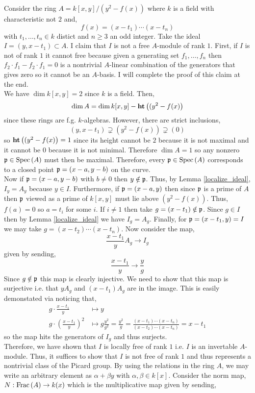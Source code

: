 \documentclass[12pt]{article}
\begin{document}
Consider the ring $A = k[x,y] / (y^2 - f(x))$ where $k$ is a field with characteristic not $2$ and,
\[ f(x) = (x - t_1) \cdots (x - t_n) \]
with $t_1, \dots, t_n \in k$ distict and $n \ge 3$ an odd integer. Take the ideal $I = (y, x - t_1) \subset A$. I claim that $I$ is not a free $A$-module of rank $1$. First, if $I$ is not of rank $1$ it cannot free because given a generating set $f_1, \dots, f_n$ then $f_2 \cdot f_1 - f_2 \cdot f_1 = 0$ is a nontrivial $A$-linear combination of the generators that gives zero so it cannot be an $A$-basis. I will complete the proof of this claim at the end.
\bigskip\\
We have $\dim{k[x,y]} = 2$ since $k$ is a field. Then, 
\[ \dim{A} = \dim{k[x,y]} - \mathbf{ht}\left( (y^2 - f(x) \right) \]
since these rings are f.g. $k$-algebras. However, there are strict inclusions,
\[ (y, x - t_1) \supsetneq (y^2 - f(x)) \supsetneq (0) \]
so $\mathbf{ht}\left( (y^2 - f(x) \right) = 1$ since its height cannot be $2$ because it is not maximal and it cannot be $0$ because it is not minimal. Therefore $\dim{A} = 1$ so any nonzero $\mathfrak{p} \in \mathrm{Spec}\left( A \right)$ must then be maximal. Therefore, every $\mathfrak{p} \in \mathrm{Spec}\left( A \right)$ corresponds to a closed point $\mathfrak{p} = (x - a, y - b)$ on the curve. 
\bigskip\\
Now if $\mathfrak{p} = (x - a, y - b)$ with $b \neq 0$ then $y \notin \mathfrak{p}$. Thus, by Lemma \ref{localize_ideal}, $I_y = A_y$ because $y \in I$. Furthermore, if $\mathfrak{p} = (x - a, y)$ then since $\mathfrak{p}$ is a prime of $A$ then $\mathfrak{p}$ viewed as a prime of $k[x,y]$ must lie above $(y^2 - f(x))$. Thus, $f(a) = 0$ so $a = t_i$ for some $i$. If $i \neq 1$ then take $g = (x - t_1) \notin \mathfrak{p}$. Since $g \in I$ then by Lemma \ref{localize_ideal} we have $I_g = A_g$. Finally, for $\mathfrak{p} = (x - t_1, y) = I$ we may take $g = (x - t_2) \cdots (x - t_n)$. Now consider the map,
\[ \frac{x - t_1}{y} A_g \to I_g \]
given by sending,
\[ \frac{x - t_1}{y} \to \frac{y}{g} \]
Since $g \notin \mathfrak{p}$ this map is clearly injective. We need to show that this map is surjective i.e. that $y A_g$ and $(x - t_1) A_g$ are in the image. This is easily demonstated via noticing that,
\begin{align*}
g \cdot \frac{x - t_1}{y} & \mapsto y 
\\
g \cdot \left( \frac{x - t_1}{y} \right)^2 & \mapsto g \frac{y^2}{g^2} = \frac{y^2}{g} = \frac{(x - t_1) \cdots (x - t_n)}{(x - t_2) \cdots (x - t_n)} = x - t_1
\end{align*}
so the map hits the generators of $I_g$ and thus surjects. 
\bigskip\\
Therefore, we have shown that $I$ is locally free of rank $1$ i.e. $I$ is an invertable $A$-module. Thus, it suffices to show that $I$ is not free of rank $1$ and thus represents a nontrivial class of the Picard group. By using the relations in the ring $A$, we may write an arbitrary element as $\alpha + \beta y$ with $\alpha, \beta \in k[x]$. Consider the norm map, $N : \mathrm{Frac}\left(A\right) \to k(x)$ which is the multiplicative map given by sending,
\end{document}
